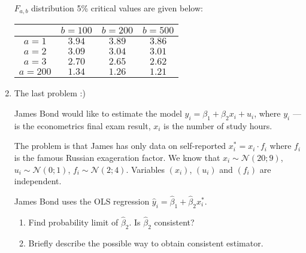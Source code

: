 \documentclass[12pt]{article}
\def \cN{\mathcal{N}}
\begin{document}
\begin{enumerate}
$F_{a,b}$ distribution 5\% critical values are given below:

\begin{tabular}{cccc}
	\toprule
	& $b=100$ & $b=200$ & $b=500$  \\
	\midrule
	$a=1$ & $3.94$ & $3.89$ & $3.86$  \\
	$a=2$ & $3.09$ & $3.04$ & $3.01$ \\
	$a=3$ & $2.70$ & $2.65$ & $2.62$ \\
	$a=200$ & $1.34$ & $1.26$ & $1.21$ \\
	\bottomrule
\end{tabular}


\item The last problem :)

James Bond would like to estimate the model $y_i = \beta_1 + \beta_2 x_i + u_i$,
where $y_i$ — is the econometrics final exam result, $x_i$ is the number of study hours.

The problem is that James has only data on self-reported $x^*_i = x_i \cdot f_i$ where
$f_i$ is the famous Russian exageration factor. We know that $x_i \sim \cN(20;9)$,
$u_i \sim \cN(0;1)$, $f_i \sim \cN(2;4)$. Variables $(x_i)$, $(u_i)$ and $(f_i)$
are independent.

James Bond uses the OLS regression $\hat y_i = \hat \beta_1 + \hat\beta_2 x_i^*$.

\begin{enumerate}
	\item Find probability limit of $\hat\beta_2$. Is $\hat \beta_2$ consistent?
	\item Briefly describe the possible way to obtain consistent estimator.
\end{enumerate}





\end{enumerate}
\end{document}

